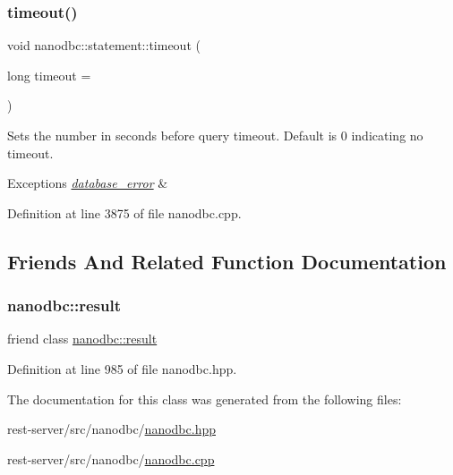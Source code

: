 \subsubsection{\texorpdfstring{timeout()}{timeout()}}
{\footnotesize\ttfamily void nanodbc\+::statement\+::timeout (\begin{DoxyParamCaption}\item[{long}]{timeout = {} }\end{DoxyParamCaption})}



Sets the number in seconds before query timeout. Default is 0 indicating no timeout. 


\begin{DoxyExceptions}{Exceptions}
{\em \mbox{\hyperlink{classnanodbc_1_1database__error}{database\+\_\+error}}} & \\
\hline
\end{DoxyExceptions}


Definition at line 3875 of file nanodbc.\+cpp.



\subsection{Friends And Related Function Documentation}
\mbox{\label{classnanodbc_1_1statement_acd5af29ec5e35cfbeb0751b6d9859b28}} 
\subsubsection{\texorpdfstring{nanodbc::result}{nanodbc::result}}
{\footnotesize\ttfamily friend class \mbox{\hyperlink{classnanodbc_1_1result}{nanodbc\+::result}}\hspace{0.3cm}{\ttfamily [friend]}}



Definition at line 985 of file nanodbc.\+hpp.



The documentation for this class was generated from the following files\+:\begin{DoxyCompactItemize}
\item 
rest-\/server/src/nanodbc/\mbox{\hyperlink{nanodbc_8hpp}{nanodbc.\+hpp}}\item 
rest-\/server/src/nanodbc/\mbox{\hyperlink{nanodbc_8cpp}{nanodbc.\+cpp}}\end{DoxyCompactItemize}
